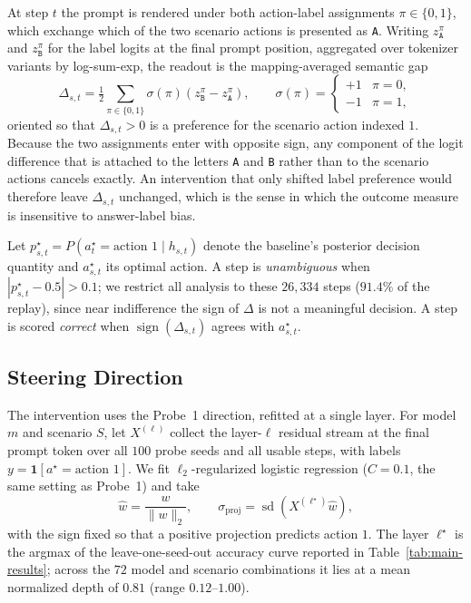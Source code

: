 At step \(t\) the prompt is rendered under both action-label assignments
\(\pi\in\{0,1\}\), which exchange which of the two scenario actions is
presented as \texttt{A}. Writing \(z^{\pi}_{\texttt{A}}\) and
\(z^{\pi}_{\texttt{B}}\) for the label logits at the final prompt position,
aggregated over tokenizer variants by log-sum-exp, the readout is the
mapping-averaged semantic gap
\begin{equation}
\Delta_{s,t}
=
\tfrac{1}{2}
\sum_{\pi\in\{0,1\}}
\sigma(\pi)\left(
z^{\pi}_{\texttt{B}}-z^{\pi}_{\texttt{A}}
\right),
\qquad
\sigma(\pi)=
\begin{cases}
+1 & \pi=0,\\
-1 & \pi=1,
\end{cases}
\end{equation}
oriented so that \(\Delta_{s,t}>0\) is a preference for the scenario action
indexed \(1\). Because the two assignments enter with opposite sign, any
component of the logit difference that is attached to the letters
\texttt{A} and \texttt{B} rather than to the scenario actions cancels exactly.
An intervention that only shifted label preference would therefore leave
\(\Delta_{s,t}\) unchanged, which is the sense in which the outcome measure is
insensitive to answer-label bias.

Let \(p^\star_{s,t}=P(a^\star_t=\text{action }1\mid h_{s,t})\) denote the
baseline's posterior decision quantity and \(a^\star_{s,t}\) its optimal action.
A step is \emph{unambiguous} when \(|p^\star_{s,t}-0.5|>0.1\); we restrict all
analysis to these \(26{,}334\) steps (\(91.4\%\) of the replay), since near
indifference the sign of \(\Delta\) is not a meaningful decision. A step is
scored \emph{correct} when \(\operatorname{sign}(\Delta_{s,t})\) agrees with
\(a^\star_{s,t}\).

\subsection{Steering Direction}

The intervention uses the Probe~1 direction, refitted at a single layer. For
model \(m\) and scenario \(S\), let \(X^{(\ell)}\) collect the layer-\(\ell\)
residual stream at the final prompt token over all \(100\) probe seeds and all
usable steps, with labels \(y=\mathbf{1}[a^\star=\text{action }1]\). We fit
\(\ell_2\)-regularized logistic regression (\(C=0.1\), the same setting as
Probe~1) and take
\begin{equation}
\hat w
=
\frac{w}{\lVert w\rVert_2},
\qquad
\sigma_{\mathrm{proj}}
=
\operatorname{sd}\!\left(X^{(\ell^\star)}\hat w\right),
\end{equation}
with the sign fixed so that a positive projection predicts action \(1\). The
layer \(\ell^\star\) is the argmax of the leave-one-seed-out accuracy curve
reported in Table~\ref{tab:main-results}; across the \(72\) model and scenario
combinations it lies at a mean normalized depth of \(0.81\) (range
\(0.12\)--\(1.00\)).


